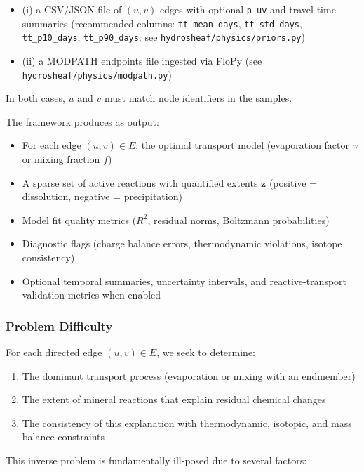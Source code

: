 \documentclass[12pt,a4paper]{article}
\theoremstyle{plain}
\theoremstyle{definition}
\theoremstyle{remark}
\begin{document}
\begin{itemize}
	      \begin{itemize}
		      \item (i) a CSV/JSON file of $(u,v)$ edges with optional \texttt{p\_uv} and travel-time summaries (recommended columns: \texttt{tt\_mean\_days}, \texttt{tt\_std\_days}, \texttt{tt\_p10\_days}, \texttt{tt\_p90\_days}; see \nolinkurl{hydrosheaf/physics/priors.py})
		      \item (ii) a MODPATH endpoints file ingested via FloPy (see \nolinkurl{hydrosheaf/physics/modpath.py})
	      \end{itemize}
	      In both cases, $u$ and $v$ must match node identifiers in the samples.
\end{itemize}

The framework produces as output:
\begin{itemize}
	\item For each edge $(u,v) \in E$: the optimal transport model (evaporation factor $\gamma$ or mixing fraction $f$)
	\item A sparse set of active reactions with quantified extents $\mathbf{z}$ (positive = dissolution, negative = precipitation)
	\item Model fit quality metrics ($R^2$, residual norms, Boltzmann probabilities)
	\item Diagnostic flags (charge balance errors, thermodynamic violations, isotope consistency)
	\item Optional temporal summaries, uncertainty intervals, and reactive-transport validation metrics when enabled
\end{itemize}


\subsubsection{Problem Difficulty}

For each directed edge $(u,v) \in E$, we seek to determine:

\begin{enumerate}
	\item The dominant transport process (evaporation or mixing with an endmember)
	\item The extent of mineral reactions that explain residual chemical changes
	\item The consistency of this explanation with thermodynamic, isotopic, and mass balance constraints
\end{enumerate}

This inverse problem is fundamentally ill-posed due to several factors:
\end{document}

